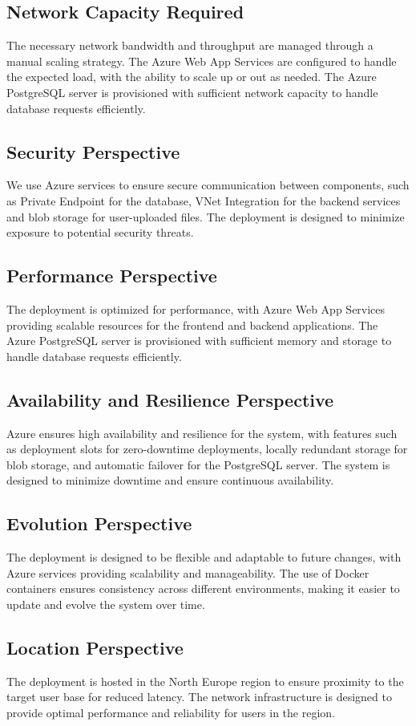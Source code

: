 \subsection{Network Capacity Required}
The necessary network bandwidth and throughput are managed through a manual scaling strategy. The Azure Web App Services are configured to handle the expected load, with the ability to scale up or out as needed. The Azure PostgreSQL server is provisioned with sufficient network capacity to handle database requests efficiently.

\subsection{Security Perspective}
We use Azure services to ensure secure communication between components, such as Private Endpoint for the database, VNet Integration for the backend services and blob storage for user-uploaded files. The deployment is designed to minimize exposure to potential security threats.

\subsection{Performance Perspective}
The deployment is optimized for performance, with Azure Web App Services providing scalable resources for the frontend and backend applications. The Azure PostgreSQL server is provisioned with sufficient memory and storage to handle database requests efficiently.

\subsection{Availability and Resilience Perspective}
Azure ensures high availability and resilience for the system, with features such as deployment slots for zero-downtime deployments, locally redundant storage for blob storage, and automatic failover for the PostgreSQL server. The system is designed to minimize downtime and ensure continuous availability.

\subsection{Evolution Perspective}
The deployment is designed to be flexible and adaptable to future changes, with Azure services providing scalability and manageability. The use of Docker containers ensures consistency across different environments, making it easier to update and evolve the system over time.

\subsection{Location Perspective}
The deployment is hosted in the North Europe region to ensure proximity to the target user base for reduced latency. The network infrastructure is designed to provide optimal performance and reliability for users in the region.
